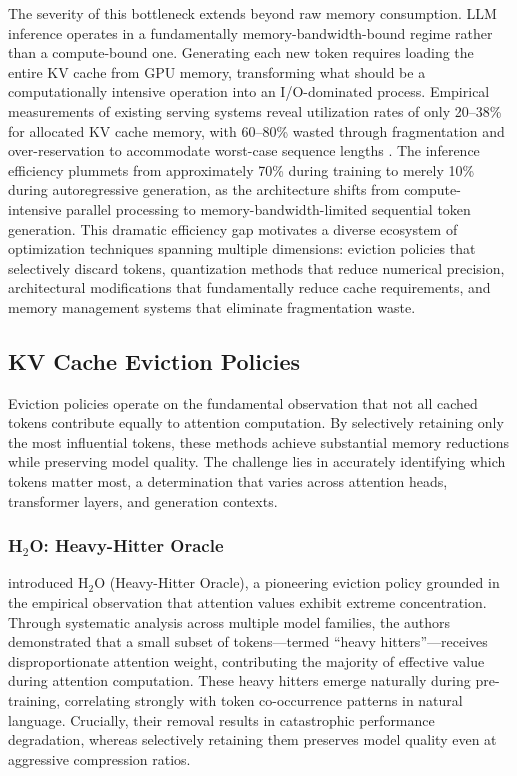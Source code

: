 \documentclass[11pt,letterpaper]{article}
\begin{document}
The severity of this bottleneck extends beyond raw memory consumption. LLM inference operates in a fundamentally memory-bandwidth-bound regime rather than a compute-bound one. Generating each new token requires loading the entire KV cache from GPU memory, transforming what should be a computationally intensive operation into an I/O-dominated process. Empirical measurements of existing serving systems reveal utilization rates of only 20--38\% for allocated KV cache memory, with 60--80\% wasted through fragmentation and over-reservation to accommodate worst-case sequence lengths \cite{kwon2023efficient}. The inference efficiency plummets from approximately 70\% during training to merely 10\% during autoregressive generation, as the architecture shifts from compute-intensive parallel processing to memory-bandwidth-limited sequential token generation. This dramatic efficiency gap motivates a diverse ecosystem of optimization techniques spanning multiple dimensions: eviction policies that selectively discard tokens, quantization methods that reduce numerical precision, architectural modifications that fundamentally reduce cache requirements, and memory management systems that eliminate fragmentation waste.

\subsection{KV Cache Eviction Policies}

Eviction policies operate on the fundamental observation that not all cached tokens contribute equally to attention computation. By selectively retaining only the most influential tokens, these methods achieve substantial memory reductions while preserving model quality. The challenge lies in accurately identifying which tokens matter most, a determination that varies across attention heads, transformer layers, and generation contexts.

\subsubsection{H$_2$O: Heavy-Hitter Oracle}

\cite{zhang2024h2o} introduced H$_2$O (Heavy-Hitter Oracle), a pioneering eviction policy grounded in the empirical observation that attention values exhibit extreme concentration. Through systematic analysis across multiple model families, the authors demonstrated that a small subset of tokens---termed ``heavy hitters''---receives disproportionate attention weight, contributing the majority of effective value during attention computation. These heavy hitters emerge naturally during pre-training, correlating strongly with token co-occurrence patterns in natural language. Crucially, their removal results in catastrophic performance degradation, whereas selectively retaining them preserves model quality even at aggressive compression ratios.
\end{document}
